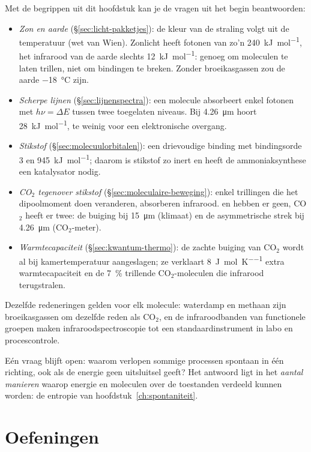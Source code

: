 Met de begrippen uit dit hoofdstuk kan je de vragen uit het begin beantwoorden:
\begin{itemize}
\item \emph{Zon en aarde} (\S\ref{sec:licht-pakketjes}): de kleur van de straling volgt uit de temperatuur (wet van Wien). Zonlicht heeft fotonen van zo'n \SI{240}{\kilo\joule\per\mole}, het infrarood van de aarde slechts \SI{12}{\kilo\joule\per\mole}: genoeg om moleculen te laten trillen, niet om bindingen te breken. Zonder broeikasgassen zou de aarde \SI{-18}{\celsius} zijn.
\item \emph{Scherpe lijnen} (\S\ref{sec:lijnenspectra}): een molecule absorbeert enkel fotonen met $h\nu = \Delta E$ tussen twee toegelaten niveaus. Bij \SI{4.26}{\micro\metre} hoort \SI{28}{\kilo\joule\per\mole}, te weinig voor een elektronische overgang.
\item \emph{Stikstof} (\S\ref{sec:molecuulorbitalen}): een drievoudige binding met bindingsorde 3 en \SI{945}{\kilo\joule\per\mole}; daarom is stikstof zo inert en heeft de ammoniaksynthese een katalysator nodig.
\item \emph{CO$_2$ tegenover stikstof} (\S\ref{sec:moleculaire-beweging}): enkel trillingen die het dipoolmoment doen veranderen, absorberen infrarood.  en  hebben er geen, CO$_2$ heeft er twee: de buiging bij \SI{15}{\micro\metre} (klimaat) en de asymmetrische strek bij \SI{4.26}{\micro\metre} (CO$_2$-meter).
\item \emph{Warmtecapaciteit} (\S\ref{sec:kwantum-thermo}): de zachte buiging van CO$_2$ wordt al bij kamertemperatuur aangeslagen; ze verklaart \SI{8}{\joule\per\mole\per\kelvin} extra warmtecapaciteit en de \SI{7}{\percent} trillende CO$_2$-moleculen die infrarood terugstralen.
\end{itemize}
Dezelfde redeneringen gelden voor elk molecule: waterdamp en methaan zijn broeikasgassen om dezelfde reden als CO$_2$, en de infraroodbanden van functionele groepen maken infraroodspectroscopie tot een standaardinstrument in labo en procescontrole.

Eén vraag blijft open: waarom verlopen sommige processen spontaan in één richting, ook als de energie geen uitsluitsel geeft? Het antwoord ligt in het \emph{aantal manieren} waarop energie en moleculen over de toestanden verdeeld kunnen worden: de entropie van hoofdstuk~\ref{ch:spontaniteit}.

\section{Oefeningen}


